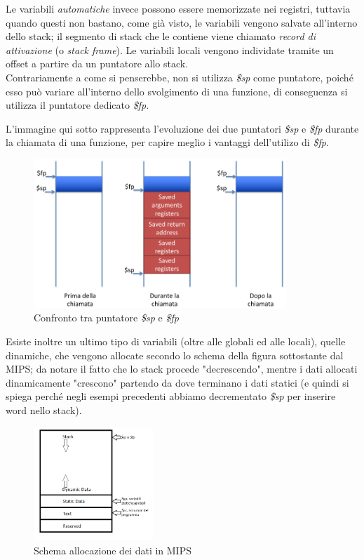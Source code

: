 \documentclass[class=book, crop=false]{standalone}
\begin{document}
Le variabili \emph{automatiche} invece possono essere memorizzate nei registri, tuttavia quando questi non bastano, come già visto, le variabili vengono salvate all'interno dello stack; il segmento di stack che le contiene viene chiamato \emph{record di attivazione} (o \emph{stack frame}). Le variabili locali vengono individate tramite un offset a partire da un puntatore allo stack.\\
Contrariamente a come si penserebbe, non si utilizza \emph{\$sp} come puntatore, poiché esso può variare all'interno dello svolgimento di una funzione, di conseguenza si utilizza il puntatore dedicato \emph{\$fp}.

L'immagine qui sotto rappresenta l'evoluzione dei due puntatori \emph{\$sp} e \emph{\$fp} durante la chiamata di una funzione, per capire meglio i vantaggi dell'utilizo di \emph{\$fp}.
\begin{figure}[H]
	\centering
	\includegraphics[width=0.85\textwidth,keepaspectratio]{sp-vs-fp}
	\caption{Confronto tra puntatore \emph{\$sp} e \emph{\$fp}}
\end{figure}

Esiste inoltre un ultimo tipo di variabili (oltre alle globali ed alle locali), quelle dinamiche, che vengono allocate secondo lo schema della figura sottostante dal MIPS; da notare il fatto che lo stack procede "decrescendo", mentre i dati allocati dinamicamente "crescono"  partendo da dove terminano i dati statici (e quindi si spiega perché negli esempi precedenti abbiamo decrementato \emph{\$sp} per inserire word nello stack).
\begin{figure}[H]
	\centering
	\includegraphics[width=0.4\textwidth,keepaspectratio]{Dove-finiscono-le-variabili}
	\caption{Schema allocazione dei dati in MIPS}
\end{figure}
\end{document}
